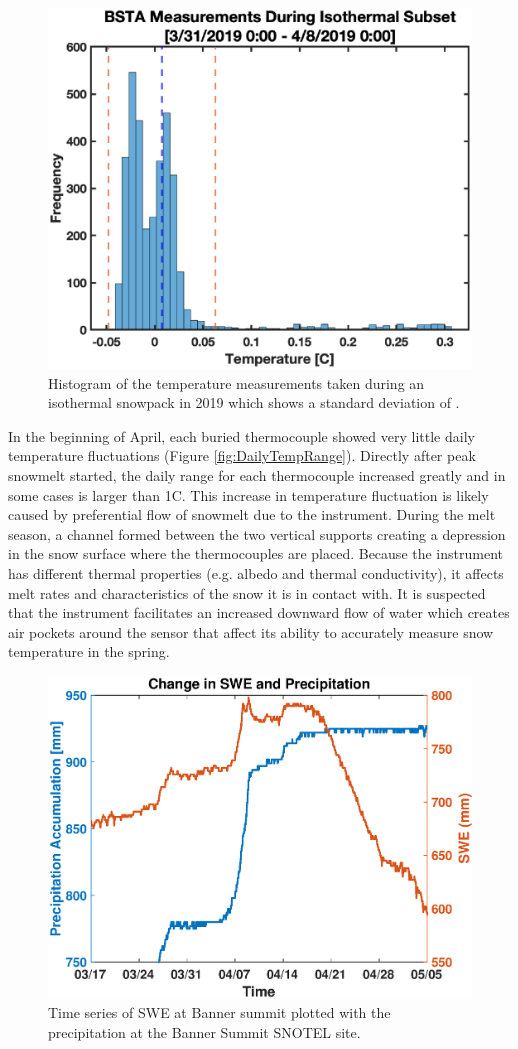 \begin{figure}[H]
    \centering
    \includegraphics[width=0.7\linewidth]{figures/Uncertainty/Isothermal_Temp_Hist.eps}
    \caption{Histogram of the temperature measurements taken during an isothermal snowpack in 2019 which shows a standard deviation of \isostd.}
    \label{fig:Iso_Temp_Hist}
\end{figure}

In the beginning of April, each buried thermocouple showed very little daily temperature fluctuations (Figure \ref{fig:DailyTempRange}). Directly after peak snowmelt started, the daily range for each thermocouple increased greatly and in some cases is larger than 1\textdegree C. This increase in temperature fluctuation is likely caused by preferential flow of snowmelt due to the instrument. During the melt season, a channel formed between the two vertical supports creating a depression in the snow surface where the thermocouples are placed. Because the instrument has different thermal properties (e.g. albedo and thermal conductivity), it affects melt rates and characteristics of the snow it is in contact with. It is suspected that the instrument facilitates an increased downward flow of water which creates air pockets around the sensor that affect its ability to accurately measure snow temperature in the spring. 

\begin{figure}[H]
    \centering
    \includegraphics[width=0.7\linewidth]{figures/TCArray/SWE_Precip_LateSeason.eps}
    \caption{Time series of SWE at Banner summit plotted with the precipitation at the Banner Summit SNOTEL site.}
    \label{fig:SWE_SNTLPrecip}
\end{figure}

